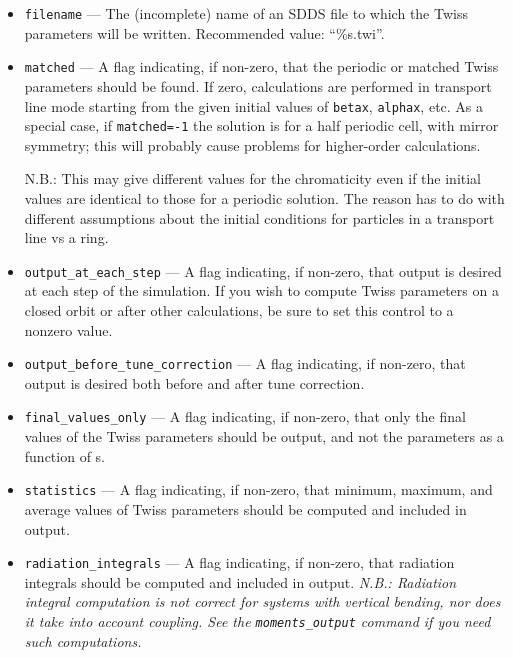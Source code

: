 \documentclass[11pt]{article}
\begin{document}
\begin{itemize}
\item \verb|filename| --- The (incomplete) name of an SDDS file to which the Twiss parameters will be written.
 Recommended value: ``\%s.twi''.
\item \verb|matched| --- A flag indicating, if non-zero, that the periodic or matched Twiss parameters should be found.
  If zero, calculations are performed in transport line mode starting from the given initial values of \verb|betax|, \verb|alphax|,
  etc. 
  As a special case, if \verb|matched=-1| the solution is for a half periodic cell, with mirror symmetry; this will probably
  cause problems for higher-order calculations.

  N.B.: This may give different values for the chromaticity even if the initial values are identical to those for a periodic solution.
  The reason has to do with different assumptions about the initial conditions for particles in a transport line vs a ring.
\item \verb|output_at_each_step| --- A flag indicating, if non-zero, that output is desired at each step of the simulation.
  If you wish to compute Twiss parameters on a closed orbit or after other calculations, be sure to set this control to a nonzero value.
\item \verb|output_before_tune_correction| --- A flag indicating, if non-zero, that output is desired both before and after
tune correction.
\item \verb|final_values_only| --- A flag indicating, if non-zero, that only the final values of the Twiss parameters should
be output, and not the parameters as a function of s.
\item \verb|statistics| --- A flag indicating, if non-zero, that minimum, maximum, and average values of
Twiss parameters should be computed and included in output.
\item \verb|radiation_integrals| --- A flag indicating, if non-zero, that radiation integrals should be computed
and included in output. {\em N.B.: Radiation integral computation is not correct for systems with vertical
bending, nor does it take into account coupling.  See the \verb|moments_output| command if you need such
computations.}


\end{itemize}
\end{document}
